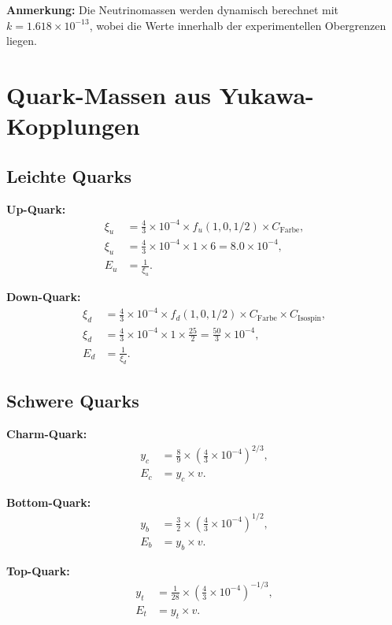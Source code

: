 \documentclass[12pt,a4paper]{article}
\begin{document}
	\textbf{Anmerkung:} Die Neutrinomassen werden dynamisch berechnet mit $k = 1.618 \times 10^{-13}$, wobei die Werte innerhalb der experimentellen Obergrenzen liegen.
	
	\section{Quark-Massen aus Yukawa-Kopplungen}
	\subsection{Leichte Quarks}
	
	\textbf{Up-Quark:}
	\begin{align}
		\xi_u &= \frac{4}{3} \times 10^{-4} \times f_u(1,0,1/2) \times C_{\text{Farbe}}, \\
		\xi_u &= \frac{4}{3} \times 10^{-4} \times 1 \times 6 = 8.0 \times 10^{-4}, \\
		E_u &= \frac{1}{\xi_u}.
	\end{align}
	
	\textbf{Down-Quark:}
	\begin{align}
		\xi_d &= \frac{4}{3} \times 10^{-4} \times f_d(1,0,1/2) \times C_{\text{Farbe}} \times C_{\text{Isospin}}, \\
		\xi_d &= \frac{4}{3} \times 10^{-4} \times 1 \times \frac{25}{2} = \frac{50}{3} \times 10^{-4}, \\
		E_d &= \frac{1}{\xi_d}.
	\end{align}
	
	\subsection{Schwere Quarks}
	
	\textbf{Charm-Quark:}
	\begin{align}
		y_c &= \frac{8}{9} \times \left(\frac{4}{3} \times 10^{-4}\right)^{2/3}, \\
		E_c &= y_c \times v.
	\end{align}
	
	\textbf{Bottom-Quark:}
	\begin{align}
		y_b &= \frac{3}{2} \times \left(\frac{4}{3} \times 10^{-4}\right)^{1/2}, \\
		E_b &= y_b \times v.
	\end{align}
	
	\textbf{Top-Quark:}
	\begin{align}
		y_t &= \frac{1}{28} \times \left(\frac{4}{3} \times 10^{-4}\right)^{-1/3}, \\
		E_t &= y_t \times v.
	\end{align}
	
\end{document}
